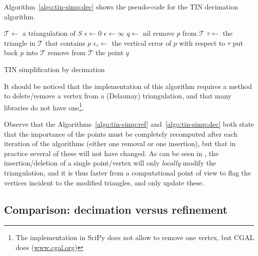 Algorithm~\ref{algo:tin-simp:dec} shows the pseudo-code for the TIN decimation algorithm.
\begin{algorithm}[tb] 
	$\mathcal{T} \leftarrow$ a triangulation of $S$ \;
	$\epsilon \leftarrow 0$ \;
	{
		$\epsilon \leftarrow \infty$  \;
		$q \leftarrow$ nil \;
		{
			remove $p$ from $\mathcal{T}$ \;
			$\tau \leftarrow$ the triangle in $\mathcal{T}$ that contains $p$ \;
			$\epsilon_{\tau} \leftarrow$ the vertical error of $p$ with respect to $\tau$ \;
			put back $p$ into $\mathcal{T}$ \;
		}
		remove from $\mathcal{T}$ the point $q$ \;
	}
	\caption{TIN simplification by decimation}
	\label{algo:tin-simp:dec}
\end{algorithm}
It should be noticed that the implementation of this algorithm requires a method to delete/remove a vertex from a (Delaunay) triangulation, and that many libraries do not have one\footnote{The implementation in SciPy does not allow to remove one vertex, but CGAL does (\url{www.cgal.org})}.

Observe that the Algorithms~\ref{algo:tin-simp:ref} and~\ref{algo:tin-simp:dec} both state that the importance of the points must be completely recomputed after each iteration of the algorithms (either one removal or one insertion), but that in practice several of these will not have changed.
As can be seen in , the insertion/deletion of a single point/vertex will only \emph{locally} modify the triangulation, and it is thus faster from a computational point of view to flag the vertices incident to the modified triangles, and only update these.


%
\subsection{Comparison: decimation versus refinement}

%

